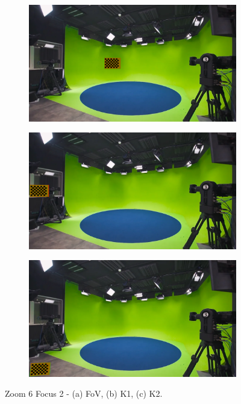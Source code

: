 \begin{figure}[h]
    \centering
    \begin{subfigure}[b]{0.45\textwidth}
        \includegraphics[width=\textwidth]{Images/08annex/results/12.2.png}
        \caption{}
        \label{fig:a2}
    \end{subfigure}
    \hfill
    \begin{subfigure}[b]{0.45\textwidth}
        \includegraphics[width=\textwidth]{Images/08annex/results/12.3.png}
        \caption{}
        \label{fig:b2}
    \end{subfigure}
    
    \vspace{0.5cm}
    
    \begin{subfigure}[b]{0.45\textwidth}
        \includegraphics[width=\textwidth]{Images/08annex/results/12.4.png}
        \caption{}
        \label{fig:c2}
    \end{subfigure}

    \caption{Zoom 6 Focus 2 - (a) FoV, (b) K1, (c) K2.}
    \label{fig:vir_fov_cal}
\end{figure}

